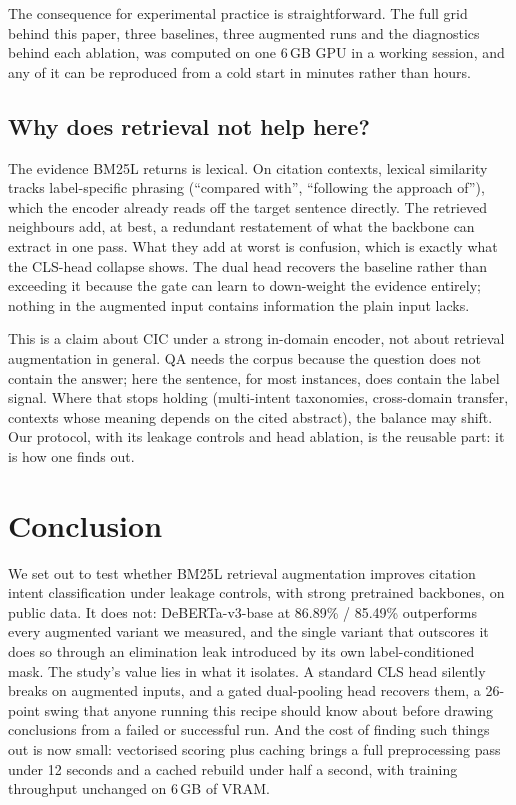 \documentclass[10pt,twocolumn,twoside]{article}
\begin{document}
The consequence for experimental practice is straightforward. The full grid
behind this paper, three baselines, three augmented runs and the diagnostics
behind each ablation, was computed on one 6\,GB GPU in a working session,
and any of it can be reproduced from a cold start in minutes rather than
hours.

\subsection{Why does retrieval not help here?}\label{sec:discussion}
The evidence BM25L returns is lexical. On citation contexts, lexical
similarity tracks label-specific phrasing (``compared with'',
``following the approach of''), which the encoder already reads off the
target sentence directly. The retrieved neighbours add, at best, a redundant
restatement of what the backbone can extract in one pass. What they add at
worst is confusion, which is exactly what the CLS-head collapse shows. The
dual head recovers the baseline rather than exceeding it because the gate can
learn to down-weight the evidence entirely; nothing in the augmented input
contains information the plain input lacks.

This is a claim about CIC under a strong in-domain encoder, not about
retrieval augmentation in general. QA needs the corpus because the question
does not contain the answer; here the sentence, for most instances, does
contain the label signal. Where that stops holding (multi-intent
taxonomies, cross-domain transfer, contexts whose meaning depends on the
cited abstract), the balance may shift. Our protocol, with its leakage
controls and head ablation, is the reusable part: it is how one finds out.

\section{Conclusion}\label{sec:conclusion}

We set out to test whether BM25L retrieval augmentation improves citation
intent classification under leakage controls, with strong pretrained
backbones, on public data. It does not: DeBERTa-v3-base at 86.89\% /
85.49\% outperforms every augmented variant we measured, and the single
variant that outscores it does so through an elimination leak introduced by
its own label-conditioned mask. The study's value
lies in what it isolates. A standard CLS head silently breaks on augmented
inputs, and a gated dual-pooling head recovers them, a 26-point swing that
anyone running this recipe should know about before drawing conclusions from
a failed or successful run. And the cost of finding such things out is now
small: vectorised scoring plus caching brings a full preprocessing pass
under 12 seconds and a cached rebuild under half a second, with training
throughput unchanged on 6\,GB of VRAM.
\end{document}
